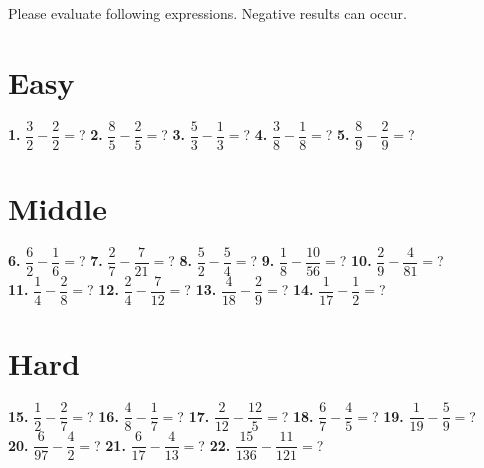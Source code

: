 \documentclass[a4paper]{article}
\begin{document}
{\large Please evaluate following expressions. Negative results can occur.}	

\section* {\Large Easy}
		
\Large {
\textbf{1.} $\dfrac{3}{2} - \dfrac{2}{2} =$? \hspace{0.25cm}
\textbf{2.} $\dfrac{8}{5} - \dfrac{2}{5} =$? \hspace{0.25cm}
\textbf{3.} $\dfrac{5}{3} - \dfrac{1}{3} =$? \hspace{0.25cm}
\textbf{4.} $\dfrac{3}{8} - \dfrac{1}{8} =$? \hspace{0.25cm}
\textbf{5.} $\dfrac{8}{9} - \dfrac{2}{9} =$?
}
		
\section* {\Large Middle}
		
\Large {
\textbf{6.} $\dfrac{6}{2} - \dfrac{1}{6} =$? \hspace{0.25cm}
\textbf{7.} $\dfrac{2}{7} - \dfrac{7}{21} =$? \hspace{0.25cm}
\textbf{8.} $\dfrac{5}{2} - \dfrac{5}{4} =$? \hspace{0.25cm}
\textbf{9.} $\dfrac{1}{8} - \dfrac{10}{56} =$? \hspace{0.25cm}
\textbf{10.} $\dfrac{2}{9} - \dfrac{4}{81} =$? \\ [0.25cm]
\textbf{11.} $\dfrac{1}{4} - \dfrac{2}{8}=$? \hspace{0.25cm}
\textbf{12.} $\dfrac{2}{4} - \dfrac{7}{12} =$? \hspace{0.25cm}
\textbf{13.} $\dfrac{4}{18} - \dfrac{2}{9} =$? \hspace{0.25cm}
\textbf{14.} $\dfrac{1}{17} - \dfrac{1}{2} =$?
}
		
\section* {\Large Hard}

\Large {
\textbf{15.} $\dfrac{1}{2} - \dfrac{2}{7} =$? \hspace{0.25cm}
\textbf{16.} $\dfrac{4}{8} - \dfrac{1}{7} =$? \hspace{0.25cm}
\textbf{17.} $\dfrac{2}{12} - \dfrac{12}{5} =$? \hspace{0.25cm}
\textbf{18.} $\dfrac{6}{7} - \dfrac{4}{5} =$?  \hspace{0.25cm}
\textbf{19.} $\dfrac{1}{19} - \dfrac{5}{9} =$? \\[0.25cm]
\textbf{20.} $\dfrac{6}{97} - \dfrac{4}{2} =$? \hspace{0.25cm}
\textbf{21.} $\dfrac{6}{17} - \dfrac{4}{13} =$? \hspace{0.25cm}
\textbf{22.} $\dfrac{15}{136} - \dfrac{11}{121} =$?
}
\end{document}
